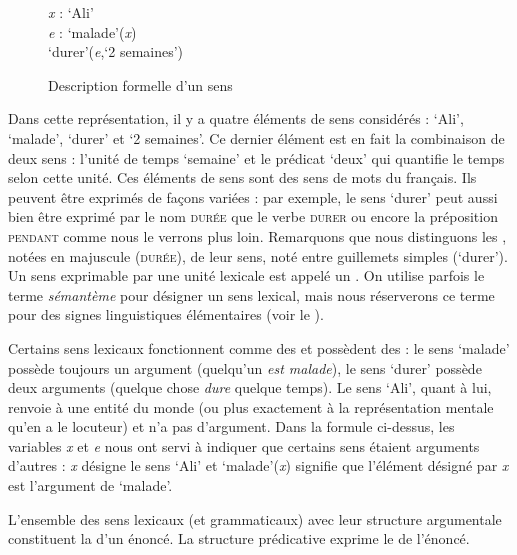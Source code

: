 \begin{figure}
 \caption{Description formelle d’un sens\label{fig:sens-maladie}}
\hbox{}\hfill\parbox{\widthof{‘durer’(\textit{e},‘2 semaines’)~~~}}{%
\textit{x} : ‘Ali’\\
\noindent\textit{e} : ‘malade’(\textit{x})\\
\noindent‘durer’(\textit{e},‘2 semaines’)}\hfill\hbox{}
\end{figure}

Dans cette représentation, il y a quatre éléments de sens considérés : ‘Ali’, ‘malade’, ‘durer’ et ‘2 semaines’. Ce dernier élément est en fait la combinaison de deux sens : l’unité de temps ‘semaine’ et le prédicat ‘deux’ qui quantifie le temps selon cette unité. Ces éléments de sens sont des sens de mots du français. Ils peuvent être exprimés de façons variées : par exemple, le sens ‘durer’ peut aussi bien être exprimé par le nom \textsc{durée} que le verbe \textsc{durer} ou encore la préposition \textsc{pendant} comme nous le verrons plus loin. Remarquons que nous distinguons les , notées en majuscule (\textsc{durée}), de leur sens, noté entre guillemets simples (‘durer’). Un sens exprimable par une unité lexicale est appelé un . On utilise parfois le terme \textit{sémantème} pour désigner un sens lexical, mais nous réserverons ce terme pour des signes linguistiques élémentaires (voir le ).

Certains sens lexicaux fonctionnent comme des  et possèdent des  : le sens ‘malade’ possède toujours un argument ({quelqu’un} \textit{est malade}), le sens ‘durer’ possède deux arguments (quelque chose \textit{dure} quelque temps). Le sens ‘Ali’, quant à lui, renvoie à une entité du monde (ou plus exactement à la représentation mentale qu’en a le locuteur) et n’a pas d’argument. Dans la formule ci-dessus, les variables \textit{x} et \textit{e} nous ont servi à indiquer que certains sens étaient arguments d’autres : \textit{x} désigne le sens ‘Ali’ et ‘malade’(\textit{x}) signifie que l’élément désigné par \textit{x} est l’argument de ‘malade’.

{L'ensemble des sens lexicaux (et grammaticaux) avec leur structure argumentale constituent la  d'un énoncé. La structure prédicative exprime le  de l’énoncé.}

